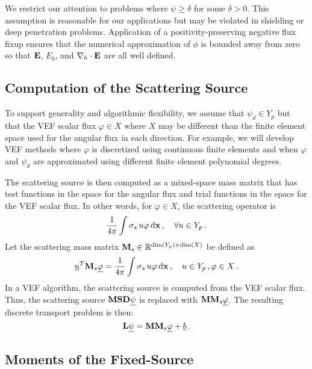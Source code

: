 \documentclass[../doc.tex]{subfiles}
\begin{document}
We restrict our attention to problems where $\psi\geq\delta$ for some $\delta > 0$. This assumption is reasonable for our applications but may be violated in shielding or deep penetration problems. Application of a positivity-preserving negative flux fixup ensures that the numerical approximation of $\phi$ is bounded away from zero so that $\boldsymbol{\mathrm{E}}$, $E_b$, and $\nabla_h\cdot\boldsymbol{\mathrm{E}}$ are all well defined. 

\subsection{Computation of the Scattering Source}
To support generality and algorithmic flexibility, we assume that $\psi_d \in Y_p$ but that the VEF scalar flux $\varphi \in X$ where $X$ may be different than the finite element space used for the angular flux in each direction. For example, we will develop VEF methods where $\varphi$ is discretized using continuous finite elements and when $\varphi$ and $\psi_d$ are approximated using different finite element polynomial degrees. 

The scattering source is then computed as a mixed-space mass matrix that has test functions in the space for the angular flux and trial functions in the space for the VEF scalar flux. In other words, for $\varphi \in X$, the scattering operator is 
	\begin{equation}
		\frac{1}{4\pi}\int \sigma_s\, u \varphi \mathop{}\!\mathrm{d} \boldsymbol{\mathrm{x}} \,, \quad \forall u \in Y_p \,. 		
	\end{equation}
Let the scattering mass matrix $\boldsymbol{\mathrm{M}}_s \in \mathbb{R}^{\dim(Y_p) \times \dim(X)}$ be defined as 
	\begin{equation}
		\underline{u}^T\boldsymbol{\mathrm{M}}_s \underline{\varphi} = \frac{1}{4\pi}\int \sigma_s\, u\varphi \mathop{}\!\mathrm{d} \boldsymbol{\mathrm{x}} \,, \quad u \in Y_p \,, \varphi \in X \,. 
	\end{equation}
In a VEF algorithm, the scattering source is computed from the VEF scalar flux. Thus, the scattering source $\boldsymbol{\mathrm{M}}\boldsymbol{\mathrm{S}}\boldsymbol{\mathrm{D}}\underline{\psi}$ is replaced with $\boldsymbol{\mathrm{M}}\boldsymbol{\mathrm{M}}_s\underline{\varphi}$. The resulting discrete transport problem is then: 
	\begin{equation}
		\boldsymbol{\mathrm{L}}\underline{\psi} = \boldsymbol{\mathrm{M}}\boldsymbol{\mathrm{M}}_s \underline{\varphi} + \underline{b} \,. 
	\end{equation}

\subsection{Moments of the Fixed-Source}
\end{document}
